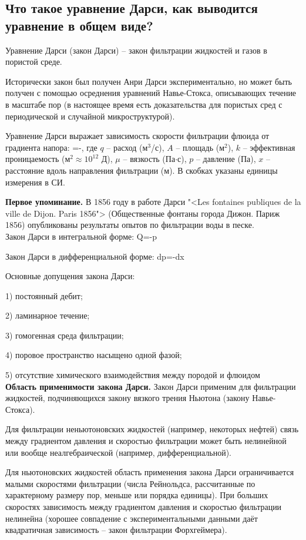 

\subsection{Что такое уравнение Дарси, как выводится уравнение в общем виде?}

Уравнение Дарси (закон Дарси) -- закон фильтрации жидкостей и газов в пористой среде.

Исторически закон был получен Анри Дарси экспериментально, но может быть получен с помощью осреднения уравнений Навье-Стокса, описывающих течение в масштабе пор (в настоящее время есть доказательства для пористых сред с периодической и случайной микроструктурой).

Уравнение Дарси выражает зависимость скорости фильтрации флюида от градиента напора:
\beq
{}=-,
\eeq
где $q$ -- расход (м$^3$/с), $A$ -- площадь (м$^2$), $k$ -- эффективная проницаемость (м$^2\approx 10^{12}$ Д), $\mu$ -- вязкость (Па$\cdot$с),
$p$ -- давление (Па), $x$ -- расстояние вдоль направления фильтрации (м).
В скобках указаны единицы измерения в СИ.

\textbf{Первое упоминание.}
В 1856 году в работе Дарси "<Les fontaines publiques de la ville de Dijon. Paris 1856"> (Общественные фонтаны города Дижон. Париж 1856) опубликованы результаты опытов по фильтрации воды в песке.
\\

Закон Дарси в интегральной форме:
\beq
Q=-\Delta p
\eeq

Закон Дарси в дифференциальной форме:
\beq\label{DiffDarcyExam}
dp=-dx
\eeq

Основные допущения закона Дарси:

1) постоянный дебит;

2) ламинарное течение;

3) гомогенная среда фильтрации;

4) поровое пространство насыщено одной фазой;

5) отсутствие химического взаимодействия между породой и флюидом
\\

\textbf{Область применимости закона Дарси.}
Закон Дарси применим для фильтрации жидкостей, подчиняющихся закону вязкого трения Ньютона (закону Навье-Стокса).

Для фильтрации неньютоновских жидкостей (например, некоторых нефтей) связь между градиентом давления и скоростью фильтрации может быть нелинейной или вообще неалгебраической (например, дифференциальной).

Для ньютоновских жидкостей область применения закона Дарси ограничивается малыми скоростями фильтрации (числа Рейнольдса, рассчитанные по характерному размеру пор, меньше или порядка единицы).
При больших скоростях зависимость между градиентом давления и скоростью фильтрации нелинейна (хорошее совпадение с экспериментальными данными даёт квадратичная зависимость -- закон фильтрации Форхгеймера).

